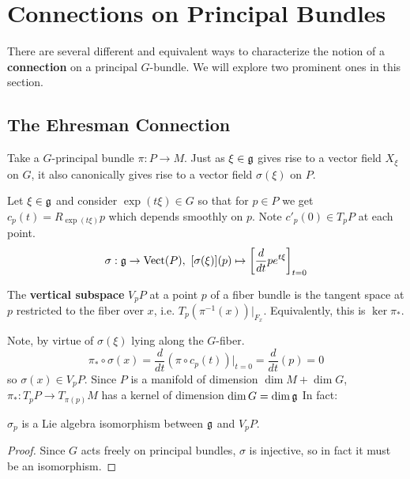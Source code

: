 		\section{Connections on Principal Bundles} %
		\label{sec:connections_on_principal_bundles}
		
		There are several different and equivalent ways to characterize the notion of a \textbf{connection} on a principal $G$-bundle. We will explore two prominent ones in this section. 
		
		\subsection{The Ehresman Connection}
		
		
		Take a $G$-principal bundle $\pi: P \rightarrow M$. 
		Just as $\xi \in \frak g$ gives rise to a vector field $X_\xi$ on $G$, it also canonically gives rise to a vector field $\sigma(\xi)$ on $P$.
		\begin{defn}
			Let $\xi \in \frak g$ and consider $\exp(t \xi) \in G$ so that for $p \in P$ we get $c_p(t) = R_{\exp(t \xi)} p$ which depends smoothly on $p$. Note $c'_p(0) \in T_p P$ at each point.
			\[
			\sigma: \frak g \rightarrow \text{Vect}(P), ~ [\sigma(\xi)](p) \mapsto \left[ \frac{d}{dt} p e^{t \xi}\right]_{t=0}
			\]
		\end{defn}
		\begin{defn}
			The \textbf{vertical subspace} $V_p P$ at a point $p$ of a fiber bundle is the tangent space at $p$ restricted to the fiber over $x$, i.e. $T_p (\pi^{-1}(x))|_{F_x}$. Equivalently, this is $\ker \pi_*$.
		\end{defn}
		Note, by virtue of $\sigma(\xi)$ lying along the $G$-fiber. 
		\[
		\pi_* \circ \sigma(x) = \frac{d}{dt} (\pi \circ c_p(t))|_{t=0} = \frac{d}{dt} (p) = 0
		\]
		so $\sigma(x) \in V_p P$. 
		Since $P$ is a manifold of dimension $\dim M + \dim G$, $\pi_*: T_pP \rightarrow T_{\pi(p)}M$ has a kernel of dimension $\dim G = \dim \frak g$
		In fact:
		\begin{prop}
			$\sigma_p$ is a Lie algebra isomorphism between $\frak g$ and $V_pP$.
		\end{prop}
		\begin{proof}
		Since $G$ acts freely on principal bundles, $\sigma$ is injective, so in fact it must be an isomorphism.
		\end{proof}
	
